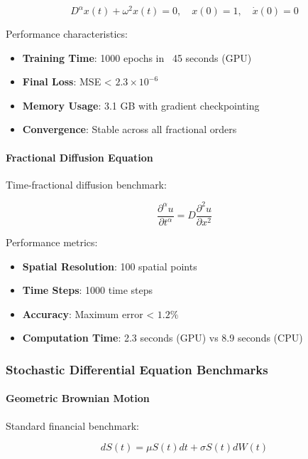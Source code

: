 \begin{equation}
D^{\alpha} x(t) + \omega^2 x(t) = 0, \quad x(0) = 1, \quad \dot{x}(0) = 0
\end{equation}

Performance characteristics:
\begin{itemize}
    \item \textbf{Training Time}: 1000 epochs in ~45 seconds (GPU)
    \item \textbf{Final Loss}: MSE < $2.3 \times 10^{-6}$
    \item \textbf{Memory Usage}: 3.1 GB with gradient checkpointing
    \item \textbf{Convergence}: Stable across all fractional orders
\end{itemize}

\paragraph{Fractional Diffusion Equation}
Time-fractional diffusion benchmark:

\begin{equation}
\frac{\partial^{\alpha} u}{\partial t^{\alpha}} = D \frac{\partial^2 u}{\partial x^2}
\end{equation}

Performance metrics:
\begin{itemize}
    \item \textbf{Spatial Resolution}: 100 spatial points
    \item \textbf{Time Steps}: 1000 time steps
    \item \textbf{Accuracy}: Maximum error < $1.2\%$
    \item \textbf{Computation Time}: 2.3 seconds (GPU) vs 8.9 seconds (CPU)
\end{itemize}

\subsubsection{Stochastic Differential Equation Benchmarks}

\paragraph{Geometric Brownian Motion}
Standard financial benchmark:

\begin{equation}
dS(t) = \mu S(t) dt + \sigma S(t) dW(t)
\end{equation}

